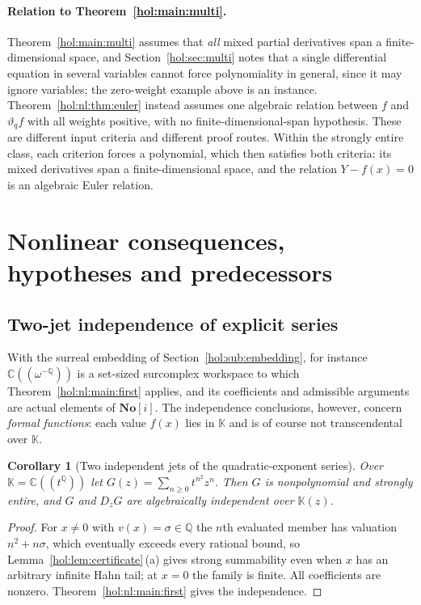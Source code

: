 \documentclass[11pt]{article}
\numberwithin{equation}{section}
\newtheorem{corollary}[theorem]{Corollary}
\theoremstyle{definition}
\theoremstyle{remark}
\newcommand{\C}{\mathbb C}
\newcommand{\Q}{\mathbb Q}
\newcommand{\No}{\mathbf{No}}
\newcommand{\KK}{\mathbb K}
\begin{document}
\paragraph{Relation to Theorem~\ref{hol:main:multi}.}
Theorem~\ref{hol:main:multi} assumes that \emph{all} mixed partial
derivatives span a finite-dimensional space, and Section~\ref{hol:sec:multi}
notes that a single differential equation in several variables cannot force
polynomiality in general, since it may ignore variables; the zero-weight
example above is an instance. Theorem~\ref{hol:nl:thm:euler} instead assumes
one algebraic relation between $f$ and $\vartheta_qf$ with all weights
positive, with no finite-dimensional-span hypothesis. These are different
input criteria and different proof routes. Within the strongly entire class,
each criterion forces a polynomial, which then satisfies both criteria:
its mixed derivatives span a finite-dimensional space, and the relation
$Y-f(x)=0$ is an algebraic Euler relation.

\section{Nonlinear consequences, hypotheses and predecessors}
\label{hol:nl:sec:consequences}

\subsection{Two-jet independence of explicit series}\label{hol:nl:sub:jets}

With the surreal embedding of Section~\ref{hol:sub:embedding}, for instance
$\C((\omega^{-\Q}))$ is a set-sized surcomplex workspace to which
Theorem~\ref{hol:nl:main:first} applies, and its coefficients and admissible
arguments are actual elements of $\No[i]$. The independence conclusions,
however, concern \emph{formal functions}: each value $f(x)$ lies in $\KK$ and
is of course not transcendental over $\KK$.

\begin{corollary}[Two independent jets of the quadratic-exponent series]
\label{hol:nl:cor:theta}
Over $\KK=\C((t^\Q))$ let $G(z)=\sum_{n\ge0}t^{n^2}z^n$. Then $G$ is
nonpolynomial and strongly entire, and $G$ and $D_zG$ are algebraically
independent over $\KK(z)$.
\end{corollary}

\begin{proof}
For $x\ne0$ with $v(x)=\sigma\in\Q$ the $n$th evaluated member has valuation
$n^2+n\sigma$, which eventually exceeds every rational bound, so
Lemma~\ref{hol:lem:certificate}\,(a) gives strong summability even when $x$
has an arbitrary infinite Hahn tail; at $x=0$ the family is finite. All
coefficients are nonzero. Theorem~\ref{hol:nl:main:first} gives the
independence.
\end{proof}
\end{document}
